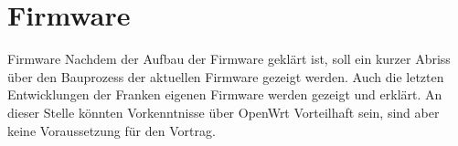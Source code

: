 \section{Firmware}

\begin{frame}{Firmware}
Nachdem der Aufbau der Firmware geklärt ist, soll ein kurzer Abriss
über den Bauprozess der aktuellen Firmware gezeigt werden. Auch die
letzten Entwicklungen der Franken eigenen Firmware werden gezeigt
und erklärt. An dieser Stelle könnten Vorkenntnisse über OpenWrt
Vorteilhaft sein, sind aber keine Voraussetzung für den Vortrag.
\end{frame}

